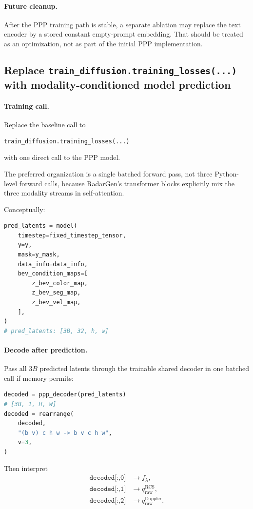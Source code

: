 \documentclass[11pt,a4paper]{article}
\begin{document}
\paragraph{Future cleanup.}
After the PPP training path is stable, a separate ablation may replace the text encoder by a stored constant empty-prompt embedding. That should be treated as an optimization, not as part of the initial PPP implementation.

\subsection{Replace \texttt{train\_diffusion.training\_losses(...)} with modality-conditioned model prediction}

\paragraph{Training call.}
Replace the baseline call to
\begin{lstlisting}
train_diffusion.training_losses(...)
\end{lstlisting}
with one direct call to the PPP model.

The preferred organization is a single batched forward pass, not three Python-level forward calls, because RadarGen's transformer blocks explicitly mix the three modality streams in self-attention.

Conceptually:
\begin{lstlisting}[language=Python]
pred_latents = model(
    timestep=fixed_timestep_tensor,
    y=y,
    mask=y_mask,
    data_info=data_info,
    bev_condition_maps=[
        z_bev_color_map,
        z_bev_seg_map,
        z_bev_vel_map,
    ],
)
# pred_latents: [3B, 32, h, w]
\end{lstlisting}

\paragraph{Decode after prediction.}
Pass all \(3B\) predicted latents through the trainable shared decoder in one batched call if memory permits:
\begin{lstlisting}[language=Python]
decoded = ppp_decoder(pred_latents)
# [3B, 1, H, W]
decoded = rearrange(
    decoded,
    "(b v) c h w -> b v c h w",
    v=3,
)
\end{lstlisting}

Then interpret
\begin{align*}
\texttt{decoded[:,0]} &\rightarrow f_\lambda,\\
\texttt{decoded[:,1]} &\rightarrow q_{\mathrm{raw}}^{\mathrm{RCS}},\\
\texttt{decoded[:,2]} &\rightarrow q_{\mathrm{raw}}^{\mathrm{Doppler}}.
\end{align*}
\end{document}
